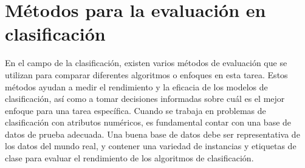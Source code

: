 \section{Métodos para la evaluación en clasificación}
En el campo de la clasificación, existen varios métodos de evaluación que se utilizan para comparar diferentes algoritmos o enfoques en esta tarea. Estos métodos ayudan a medir el rendimiento y la eficacia de los modelos de clasificación, así como a tomar decisiones informadas sobre cuál es el mejor enfoque para una tarea específica. Cuando se trabaja en problemas de clasificación con atributos numéricos, es fundamental contar con una base de datos de prueba adecuada. Una buena base de datos debe ser representativa de los datos del mundo real, y contener una variedad de instancias y etiquetas de clase para evaluar el rendimiento de los algoritmos de clasificación.

